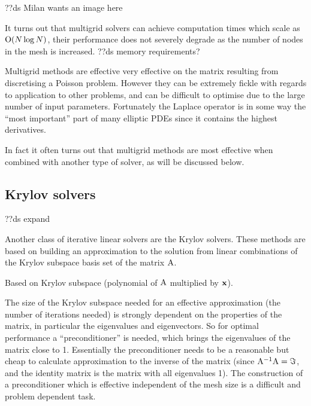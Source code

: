 ??ds Milan wants an image here

It turns out that multigrid solvers can achieve computation times which scale as $\text{O}{\left( N \log N \right)}$, \ie their performance does not severely degrade as the number of nodes in the mesh is increased.
??ds memory requirements?

Multigrid methods are effective very effective on the matrix resulting from discretising a Poisson problem.
However they can be extremely fickle with regards to application to other problems, and can be difficult to optimise due to the large number of input parameters.
Fortunately the Laplace operator is in some way the ``most important'' part of many elliptic PDEs since it contains the highest derivatives.

In fact it often turns out that multigrid methods are most effective when combined with another type of solver, as will be discussed below.


\subsection{Krylov solvers}
\label{sec:krylov-solvers}

??ds expand

Another class of iterative linear solvers are the Krylov solvers.
These methods are based on building an approximation to the solution from linear combinations of the Krylov subspace basis set of the matrix $\mathrm{A}$.

Based on Krylov subspace (polynomial of $\mathrm{A}$ multiplied by $\mathbf{x}$).

The size of the Krylov subspace needed for an effective approximation (\ie the number of iterations needed) is strongly dependent on the properties of the matrix, in particular the eigenvalues and eigenvectors.
So for optimal performance a ``preconditioner'' is needed, which brings the eigenvalues of the matrix close to 1.
Essentially the preconditioner needs to be a reasonable but cheap to calculate approximation to the inverse of the matrix (since $\mathrm{A}^{-1}\mathrm{A} = \Im$, and the identity matrix is the matrix with all eigenvalues 1).
The construction of a preconditioner which is effective independent of the mesh size is a difficult and problem dependent task. 




